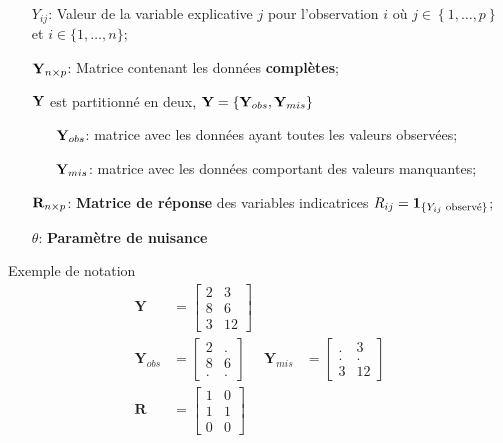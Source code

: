 \documentclass[10pt, french]{article}
\begin{document}
\begin{multicols*}{3}
\begin{definition}[Notation]
\begin{itemize}[leftmargin = *]
	\item[$Y_{ij}$:] Valeur de la variable explicative $j$ pour l'observation $i$ où	$j \in \left\{ 1, \dots, p \right\}$ et $i \in \{1, \dots, n\}$;
	\item[$\mathbf{Y}_{n \times p}$:] Matrice contenant les données \textbf{complètes};
	\item[]	$\mathbf{Y}$ est partitionné en deux, $\mathbf{Y} = \left\{ \mathbf{Y}_{obs}, \mathbf{Y}_{mis} \right\}$
		\begin{itemize}[leftmargin = *]
		\item[$\mathbf{Y}_{obs}$:] matrice avec les données ayant toutes les valeurs observées;
		\item[$\mathbf{Y}_{mis}$:] matrice avec les données comportant des valeurs manquantes;
		\end{itemize}
	\item[$\mathbf{R}_{n \times p}$:]	\textbf{Matrice de réponse} des variables indicatrices $R_{ij} = \mathbf{1}_{\{Y_{ij} \text{ observé}\}}$;
	\item[$\theta$:] \textbf{Paramètre de nuisance}
\end{itemize}
\end{definition}

\begin{examplebox}{Exemple de notation}
\begin{align*}
	\bm{Y}	
	&=	\begin{bmatrix}
		2	&	3	\\
		8	&	6	\\
		3	&	12	
		\end{bmatrix}	\\
	\bm{Y}_{obs}
	&=	\begin{bmatrix}
		2	&	.	\\
		8	&	6	\\
		.	&	.
		\end{bmatrix}	&
	\bm{Y}_{mis}
	&=	\begin{bmatrix}
		.	&	3	\\
		.	&	.	\\
		3	&	12	
		\end{bmatrix}	\\
	\bm{R}
	&=	\begin{bmatrix}
		1	&	0	\\
		1	&	1	\\
		0	&	0	
		\end{bmatrix}	
\end{align*}
\end{examplebox}


\end{multicols*}
\end{document}
